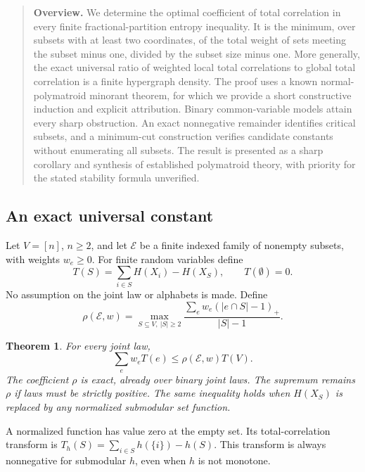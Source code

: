 \documentclass[11pt,a4paper]{article}
\newtheorem{theorem}{Theorem}[section]
\theoremstyle{definition}\newtheorem{definition}[theorem]{Definition}
\theoremstyle{remark}\newtheorem{remark}[theorem]{Remark}
\numberwithin{equation}{section}
\begin{document}
\begin{quote}\small\textbf{Overview.} We determine the optimal coefficient of total correlation in every finite fractional-partition entropy inequality. It is the minimum, over subsets with at least two coordinates, of the total weight of sets meeting the subset minus one, divided by the subset size minus one. More generally, the exact universal ratio of weighted local total correlations to global total correlation is a finite hypergraph density. The proof uses a known normal-polymatroid minorant theorem, for which we provide a short constructive induction and explicit attribution. Binary common-variable models attain every sharp obstruction. An exact nonnegative remainder identifies critical subsets, and a minimum-cut construction verifies candidate constants without enumerating all subsets. The result is presented as a sharp corollary and synthesis of established polymatroid theory, with priority for the stated stability formula unverified.\end{quote}

\subsection{An exact universal constant}\label{R05-sec-1}
Let $V=[n]$, $n\geq2$, and let $\mathcal E$ be a finite indexed family of nonempty subsets, with weights $w_e\geq0$. For finite random variables define
\[
T(S)=\sum_{i\in S}H(X_i)-H(X_S),\qquad T(\emptyset)=0.
\]
No assumption on the joint law or alphabets is made. Define
\begin{equation}\label{R05-rho}
\rho(\mathcal E,w)=\max_{S\subseteq V,\ |S|\geq2}
\frac{\sum_e w_e(|e\cap S|-1)_+}{|S|-1}.
\end{equation}
\begin{theorem}\label{R05-universal}
For every joint law,
\begin{equation}\label{R05-tcineq}
\sum_e w_eT(e)\leq\rho(\mathcal E,w)T(V).
\end{equation}
The coefficient $\rho$ is exact, already over binary joint laws. The supremum remains $\rho$ if laws must be strictly positive. The same inequality holds when $H(X_S)$ is replaced by any normalized submodular set function.
\end{theorem}
A normalized function has value zero at the empty set. Its total-correlation transform is $T_h(S)=\sum_{i\in S}h(\{i\})-h(S)$. This transform is always nonnegative for submodular $h$, even when $h$ is not monotone.
\end{document}
